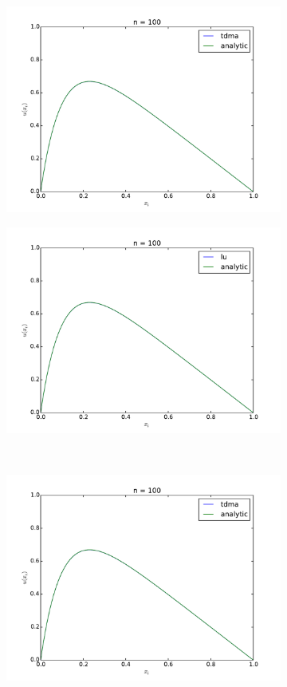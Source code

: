 \documentclass[10pt,a4paper]{amsart}
\begin{document}
\begin{figure}[htb]
\begin{subfigure}{0.3\textwidth}
    \includegraphics[width=\textwidth]{../plots/tdma_100} 
  \end{subfigure}
  \begin{subfigure}{0.3\textwidth}
    \includegraphics[width=\textwidth]{../plots/lu_100} 
  \end{subfigure}
  \\
  \begin{subfigure}{0.3\textwidth}
    \includegraphics[width=\textwidth]{../plots/tdma_100} 

\end{subfigure}
\end{figure}
\end{document}
